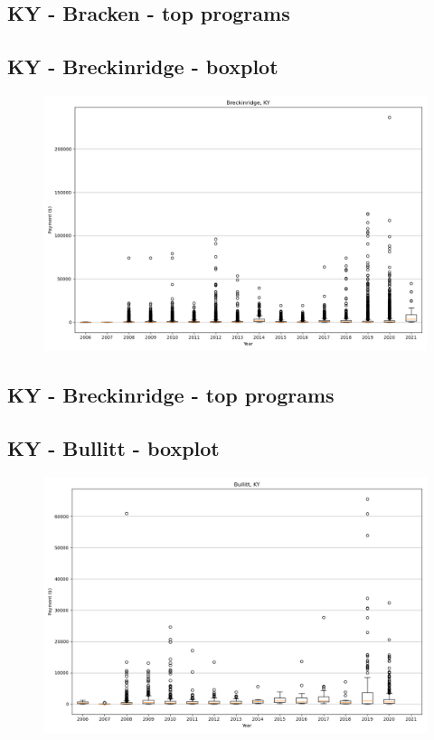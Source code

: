 \subsection*{KY - Bracken - top programs}

\newpage
\subsection*{KY - Breckinridge - boxplot}
\begin{figure}[h]
\centering
\includegraphics[width=7in]{../output/boxplots/counties/Breckinridge-KY_boxplot.png}
\end{figure}


\subsection*{KY - Breckinridge - top programs}

\newpage
\subsection*{KY - Bullitt - boxplot}
\begin{figure}[h]
\centering
\includegraphics[width=7in]{../output/boxplots/counties/Bullitt-KY_boxplot.png}
\end{figure}


